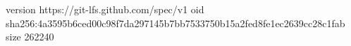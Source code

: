 version https://git-lfs.github.com/spec/v1
oid sha256:4a3595b6ced00c98f7da297145b7bb7533750b15a2fed8fe1ec2639cc28c1fab
size 262240
